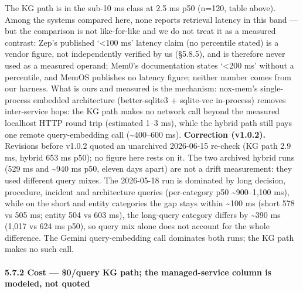 \documentclass[
]{article}
\newcounter{none} %
\begin{document}
The KG path is in the sub-10 ms class at 2.5 ms p50 (n=120, table
above). Among the systems compared here, none reports retrieval latency
in this band --- but the comparison is not like-for-like and we do not
treat it as a measured contrast: Zep's published `\textless100 ms'
latency claim (no percentile stated) is a vendor figure, not
independently verified by us (§5.8.5), and is therefore never used as a
measured operand; Mem0's documentation states `\textless200 ms' without
a percentile, and MemOS publishes no latency figure; neither number
comes from our harness. What is ours and measured is the mechanism:
nox-mem's single-process embedded architecture (better-sqlite3 +
sqlite-vec in-process) removes inter-service hops: the KG path makes no
network call beyond the measured localhost HTTP round trip (estimated
1--3 ms), while the hybrid path still pays one remote query-embedding
call (\textasciitilde400--600 ms). \textbf{Correction (v1.0.2).}
Revisions before v1.0.2 quoted an unarchived 2026-06-15 re-check (KG
path 2.9 ms, hybrid 653 ms p50); no figure here rests on it. The two
archived hybrid runs (529 ms and \textasciitilde940 ms p50, eleven days
apart) are not a drift measurement: they used different query mixes. The
2026-05-18 run is dominated by long decision, procedure, incident and
architecture queries (per-category p50 \textasciitilde900--1,100 ms),
while on the short and entity categories the gap stays within
\textasciitilde100 ms (short 578 vs 505 ms; entity 504 vs 603 ms), the
long-query category differs by \textasciitilde390 ms (1,017 vs 624 ms
p50), so query mix alone does not account for the whole difference. The
Gemini query-embedding call dominates both runs; the KG path makes no
such call.

\paragraph{5.7.2 Cost --- \$0/query KG path; the managed-service column
is modeled, not
quoted}\label{cost-0query-kg-path-the-managed-service-column-is-modeled-not-quoted}
\end{document}
